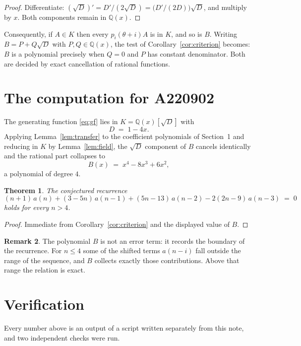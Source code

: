 \documentclass[11pt,a4paper]{article}
\theoremstyle{plain}
\newtheorem{theorem}{Theorem}
\theoremstyle{definition}
\newtheorem{remark}[theorem]{Remark}
\begin{document}
\begin{proof}
Differentiate: $(\sqrt{D})'=D'/(2\sqrt{D})=\bigl(D'/(2D)\bigr)\sqrt{D}$, and multiply by
$x$. Both components remain in $\mathbb{Q}(x)$.
\end{proof}

Consequently, if $A\in K$ then every $p_{i}(\theta+i)A$ is in $K$, and so is $B$. Writing
$B=P+Q\sqrt{D}$ with $P,Q\in\mathbb{Q}(x)$, the test of Corollary~\ref{cor:criterion}
becomes: $B$ is a polynomial precisely when $Q=0$ and $P$ has constant denominator. Both
are decided by exact cancellation of rational functions.

\section{The computation for A220902}

The generating function \eqref{eq:gf} lies in $K=\mathbb{Q}(x)[\sqrt{D}]$ with
\[
D \;=\; 1 - 4 x .
\]
Applying Lemma~\ref{lem:transfer} to the coefficient polynomials of Section~1 and reducing
in $K$ by Lemma~\ref{lem:field}, the $\sqrt{D}$ component of $B$ cancels identically and
the rational part collapses to
\[
B(x)\;=\;x^{4} - 8 x^{3} + 6 x^{2} ,
\]
a polynomial of degree $4$.

\begin{theorem}
The conjectured recurrence
\[
(n + 1)\,a(n) + (3 - 5 n)\,a(n-1) + (5 n - 13)\,a(n-2) -  2 \left(2 n - 9\right)\,a(n-3) \;=\;0
\]
holds for every $n>4$.
\end{theorem}

\begin{proof}
Immediate from Corollary~\ref{cor:criterion} and the displayed value of $B$.
\end{proof}

\begin{remark}
The polynomial $B$ is not an error term: it records the boundary of the recurrence. For
$n\le4$ some of the shifted terms $a(n-i)$ fall outside the range of the sequence,
and $B$ collects exactly those contributions. Above that range the relation is exact.
\end{remark}

\section{Verification}

Every number above is an output of a script written separately from this note, and two
independent checks were run.
\end{document}

